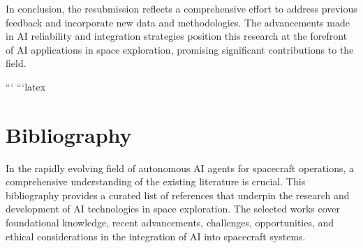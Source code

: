 \documentclass[a4paper, 11pt]{article}
\begin{document}
In conclusion, the resubmission reflects a comprehensive effort to address previous feedback and incorporate new data and methodologies. The advancements made in AI reliability and integration strategies position this research at the forefront of AI applications in space exploration, promising significant contributions to the field.

```
```latex
\section{Bibliography}

In the rapidly evolving field of autonomous AI agents for spacecraft operations, a comprehensive understanding of the existing literature is crucial. This bibliography provides a curated list of references that underpin the research and development of AI technologies in space exploration. The selected works cover foundational knowledge, recent advancements, challenges, opportunities, and ethical considerations in the integration of AI into spacecraft systems.
\end{document}
